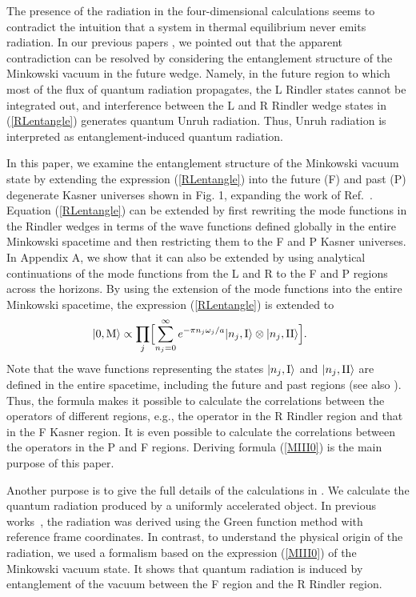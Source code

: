 \documentclass[aps,prd,preprintnumbers,nofootinbib,showpacs,11pt]{revtex4}%
\begin{document}
\begin{widetext}
The presence of the radiation in 
the four-dimensional calculations seems to contradict the intuition that a system in thermal equilibrium
never emits radiation. In our previous papers \cite{IOTYZ, ITUY}, we 
pointed out that the apparent contradiction can be resolved by considering
the entanglement structure of the Minkowski vacuum in the future wedge.
Namely, in the future region to which most of the flux of quantum radiation propagates, 
the L Rindler states cannot be integrated out, and 
interference between the L and R Rindler wedge states in  (\ref{RLentangle}) 
 generates quantum Unruh radiation.
Thus, Unruh radiation is interpreted as entanglement-induced quantum radiation.

In this paper, we examine the entanglement structure of the Minkowski vacuum state
by extending the expression (\ref{RLentangle}) into the future (F) and past (P) degenerate Kasner universes 
shown in Fig. 1, expanding the work of Ref.~\cite{Higuchi}.
Equation (\ref{RLentangle}) can be extended by first rewriting the mode functions
in the Rindler wedges in terms of the wave functions defined globally 
in the entire Minkowski spacetime and then restricting them to the F and P Kasner universes. 
In Appendix A, we show that 
it can also be extended by using analytical continuations of the mode functions
from the L and R to the F and P regions across the horizons. 
By using the extension of the mode functions into the entire Minkowski spacetime, 
the expression (\ref{RLentangle}) is extended to 
\begin{eqnarray}
\hspace{-5mm}
  |0,{\rm M}\rangle \propto \prod_j\Bigl[
\sum_{n_j=0}^\infty e^{-\pi n_j \omega_j/a }|n_j,{\I}\rangle \otimes|n_j,{\II}\rangle
\Bigr]  .
\label{MIII0}
\end{eqnarray} 
Note that the wave functions representing the states $|n_j,{{\rm I}}\rangle$ and $|n_j,{{\rm II}}\rangle$ 
are defined in the entire spacetime, including the future and past regions (see also \cite{OlsonRalph}).
Thus, the formula makes it possible to calculate the correlations between the operators of 
different regions, e.g., the operator in the R Rindler region and that in the F Kasner region. 
It is even possible to calculate the correlations between the operators in the P and F regions. 
Deriving formula (\ref{MIII0}) is the main purpose of this paper. 


Another purpose is to give the full details of the calculations in \cite{ITUY}.
We calculate the quantum radiation produced by a uniformly accelerated object.
In previous works~\cite{LH,LH2}, the radiation was derived using the Green function 
method with reference frame coordinates.
In contrast, to understand the physical origin of the radiation, 
we used a formalism based on the expression (\ref{MIII0}) of the Minkowski vacuum state.
It shows that quantum radiation is induced by entanglement of the vacuum
between the F region and the R Rindler region. 


\end{widetext}
\end{document}
